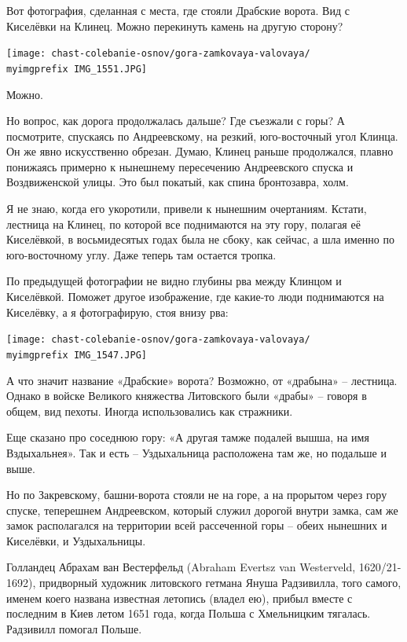 Вот фотография, сделанная с места, где стояли Драбские ворота. Вид с Киселёвки на Клинец. Можно перекинуть камень на другую сторону?

\begin{center}
\texttt{[image: chast-colebanie-osnov/gora-zamkovaya-valovaya/\\myimgprefix IMG\_1551.JPG]}
\end{center}

Можно.

Но вопрос, как дорога продолжалась дальше? Где съезжали с горы? А посмотрите, спускаясь по Андреевскому, на резкий, юго-восточный угол Клинца. Он же явно искусственно обрезан. Думаю, Клинец раньше продолжался, плавно понижаясь примерно к нынешнему пересечению Андреевского спуска и Воздвиженской улицы. Это был покатый, как спина бронтозавра, холм.

Я не знаю, когда его укоротили, привели к нынешним очертаниям. Кстати, лестница на Клинец, по которой все поднимаются на эту гору, полагая её Киселёвкой, в восьмидесятых годах была не сбоку, как сейчас, а шла именно по юго-восточному углу. Даже теперь там остается тропка.

По предыдущей фотографии не видно глубины рва между Клинцом и Киселёвкой. Поможет другое изображение, где какие-то люди поднимаются на Киселёвку, а я фотографирую, стоя внизу рва:

\begin{center}
\texttt{[image: chast-colebanie-osnov/gora-zamkovaya-valovaya/\\myimgprefix IMG\_1547.JPG]}
\end{center}

А что значит название «Драбские» ворота? Возможно, от «драбына» – лестница. Однако в войске Великого княжества Литовского были «драбы» – говоря в общем, вид пехоты. Иногда использовались как стражники.

Еще сказано про соседнюю гору: «А другая тамже подалей вышша, на имя Вздыхальнея». Так и есть – Уздыхальница расположена там же, но подальше и выше.

Но по Закревскому, башни-ворота стояли не на горе, а на прорытом через гору спуске, теперешнем Андреевском, который служил дорогой внутри замка, сам же замок располагался на территории всей рассеченной горы – обеих нынешних и Киселёвки, и Уздыхальницы.

Голландец Абрахам ван Вестерфельд (Abraham Evertsz van Westerveld, 1620/21-1692), придворный художник литовского гетмана Януша Радзивилла, того самого, именем коего названа известная летопись (владел ею), прибыл вместе с последним в Киев летом 1651 года, когда Польша с Хмельницким тягалась. Радзивилл помогал Польше.

